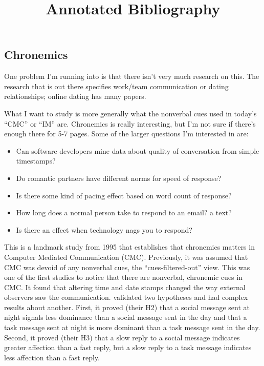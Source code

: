 \documentclass[
]{article}
\title{Annotated Bibliography}
\author{}
\date{\vspace{-2.5em}}
\providecommand{\tightlist}{%
  \setlength{\itemsep}{0pt}\setlength{\parskip}{0pt}}
\begin{document}
\maketitle

\hypertarget{chronemics}{%
\subsection{Chronemics}\label{chronemics}}

One problem I'm running into is that there isn't very much research on
this. The research that is out there specifies work/team communication
or dating relationships; online dating has many papers.

What I want to study is more generally what the nonverbal cues used in
today's ``CMC'' or ``IM'' are. Chronemics is really interesting, but I'm
not sure if there's enough there for 5-7 pages. Some of the larger
questions I'm interested in are:

\begin{itemize}
\tightlist
\item
  Can software developers mine data about quality of conversation from
  simple timestamps?
\item
  Do romantic partners have different norms for speed of response?
\item
  Is there some kind of pacing effect based on word count of response?
\item
  How long does a normal person take to respond to an email? a text?
\item
  Is there an effect when technology nags you to respond?
\end{itemize}

\textbf{}

This is a landmark study from 1995 that establishes that chronemics
matters in Computer Mediated Communication (CMC). Previously, it was
assumed that CMC was devoid of any nonverbal cues, the
``cues-filtered-out'' view. This was one of the first studies to notice
that there are nonverbal, chronemic cues in CMC. It found that altering
time and date stamps changed the way external observers saw the
communication. \textcite{walther95} validated two hypotheses and had
complex results about another. First, it proved (their H2) that a social
message sent at night signals less dominance than a social message sent
in the day and that a task message sent at night is more dominant than a
task message sent in the day. Second, it proved (their H3) that a slow
reply to a social message indicates greater affection than a fast reply,
but a slow reply to a task message indicates less affection than a fast
reply.
\end{document}
